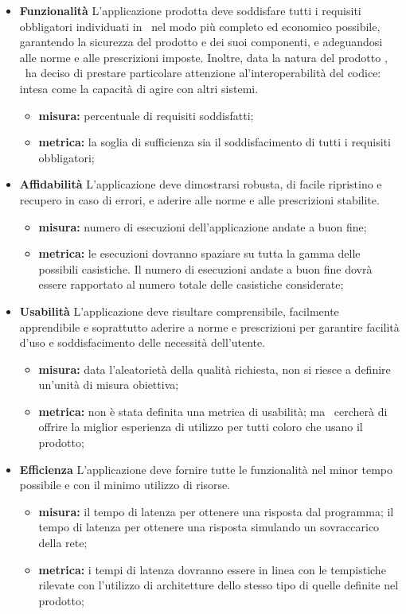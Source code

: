 \begin{itemize}
\item \textbf{Funzionalità}
L’applicazione prodotta deve soddisfare tutti i requisiti obbligatori individuati in \infoAR ~nel modo più completo ed economico possibile, garantendo la sicurezza del prodotto e dei suoi componenti, e adeguandosi alle norme e alle prescrizioni imposte. Inoltre, data la natura del prodotto \progetto, \gruppo ~ha deciso di prestare particolare attenzione al'interoperabilità del codice: intesa come la capacità di agire con altri sistemi.
\begin{itemize}
\item \textbf{misura:} percentuale di requisiti soddisfatti;
\item \textbf{metrica:} la soglia di sufficienza sia il soddisfacimento di tutti i requisiti obbligatori;
\end{itemize}

\item \textbf{Affidabilità}
L’applicazione deve dimostrarsi robusta, di facile ripristino e recupero in caso di errori, e aderire alle norme e alle prescrizioni stabilite.
\begin{itemize}
\item \textbf{misura:} numero di esecuzioni dell'applicazione andate a buon fine;
\item \textbf{metrica:} le esecuzioni dovranno spaziare su tutta la gamma delle possibili casistiche. Il numero di esecuzioni andate a buon fine dovrà essere rapportato al numero totale delle casistiche considerate;
\end{itemize}

\item \textbf{Usabilità}
L’applicazione deve risultare comprensibile, facilmente apprendibile e soprattutto aderire a norme e prescrizioni per garantire facilità d’uso e soddisfacimento delle necessità dell’utente.
\begin{itemize}
\item \textbf{misura:} data l'aleatorietà della qualità richiesta, non si riesce a definire un'unità di misura obiettiva;
\item \textbf{metrica:} non è stata definita una metrica di usabilità; ma \gruppo ~cercherà di offrire la miglior esperienza di utilizzo per tutti coloro che usano il prodotto;
\end{itemize}

\item \textbf{Efficienza}
L’applicazione deve fornire tutte le funzionalità nel minor tempo possibile e con il minimo utilizzo di risorse.
\begin{itemize}
\item \textbf{misura:} il tempo di latenza per ottenere una risposta dal programma;
il tempo di latenza per ottenere una risposta simulando un sovraccarico della rete;
\item \textbf{metrica:} i tempi di latenza dovranno essere in linea con le tempistiche rilevate con l'utilizzo di architetture dello stesso tipo di quelle definite nel prodotto;
\end{itemize}


\end{itemize}
